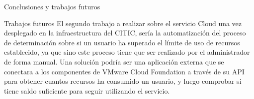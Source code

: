 \begin{chapter}{Conclusiones y trabajos futuros}
\begin{section}{Trabajos futuros}
        El segundo trabajo a realizar sobre el servicio Cloud una vez desplegado en la infraestructura del CITIC, sería la automatización del proceso de determinación sobre si un usuario ha superado el límite de uso de recursos establecido, ya que sino este proceso tiene que ser realizado por el administrador de forma manual. Una solución podría ser una aplicación externa que se conectara a los componentes de VMware Cloud Foundation a través de su API para obtener cuantos recursos ha consumido un usuario, y luego comprobar si tiene saldo suficiente para seguir utilizando el servicio.

        






\end{section}
\end{chapter}
